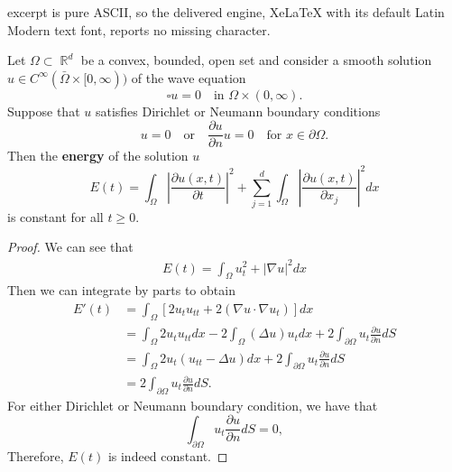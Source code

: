 \documentclass[10pt,a4paper]{amsart}
\DeclareMathOperator*{\R}{\mathbb{R}}
\newcommand{\p}{\partial}
\begin{document}
excerpt is pure ASCII, so the delivered engine, XeLaTeX with its default Latin Modern text font, reports no missing character.
\begin{theorem}\label{thm:energy_conservation}
    Let $\Omega\subset\R^d$ be a convex, bounded, open set and consider a smooth solution $u\in C^\infty(\bar\Omega\times[0,\infty))$ of the wave equation
    $$
    \square u=0\quad\text{in }\Omega\times(0,\infty).
    $$
    Suppose that $u$ satisfies Dirichlet or Neumann boundary conditions
    $$
    u=0\quad\text{or}\quad\dfrac{\partial u}{\partial n}u=0\quad\text{for }x\in\partial\Omega.
    $$
    Then the \textbf{energy} of the solution $u$
    $$
E(t)=\int_{\Omega}\left|\frac{\partial u(x, t)}{\partial t}\right|^2+\sum_{j=1}^d \int_{\Omega}\left|\frac{\partial u(x, t)}{\partial x_j}\right|^2 d x
$$
is constant for all $t\geq0$.
\end{theorem}

\begin{proof}
We can see that
\begin{align*}
    E(t)=\int_{\Omega}u_t^2+|\nabla u|^2dx
\end{align*}
Then we can integrate by parts to obtain
\begin{align*}
    E'(t)&=\int_{\Omega}\left[2u_tu_{tt}+2(\nabla u\cdot \nabla u_t)\right]dx\\
    &=\int_{\Omega}2u_tu_{tt}dx-2\int_{\Omega}(\Delta u)u_t dx + 2\int_{\p\Omega}u_t\frac{\p u}{\p n}dS\\
    &=\int_{\Omega}2u_t(u_{tt}-\Delta u)dx+ 2\int_{\p\Omega}u_t\frac{\p u}{\p n}dS\\
    &=2\int_{\p\Omega}u_t\frac{\p u}{\p n}dS.
\end{align*}
For either Dirichlet or Neumann boundary condition, we have that 
\[
\int_{\p\Omega}u_t\frac{\p u}{\p n}dS=0,
\]
Therefore, \(E(t)\) is indeed constant.
\end{proof}
\end{document}
